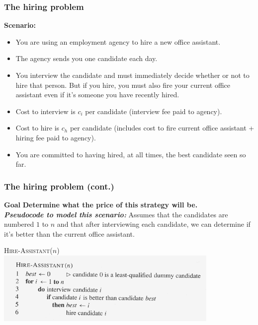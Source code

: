 \documentclass[notes,serif]{beamer}
\begin{document}
\begin{frame}
  \frametitle{The hiring problem}
  \begin{block}{\bf Scenario:}
    \begin{itemize}
      \item You are using an employment agency to hire a new office assistant.
      \item The agency sends you one candidate each day.
      \item You interview the candidate and must immediately decide whether or not to
hire that person.  But if you hire, you must also fire your current office assistant even if it's someone you have recently hired.
      \item Cost to interview is $c_i$ per candidate (interview fee paid to agency).
      \item Cost to hire is $c_h$ per candidate (includes cost to fire current office assistant + hiring fee paid to agency).
      \item You are committed to having hired, at all times, the best candidate seen so far.
    \end{itemize}
  \end{block}
\end{frame}

\begin{frame}
  \frametitle{The hiring problem (cont.)}
  \begin{alertblock}{\bf Goal}
    {\bf Determine what the price of this strategy will be.} \\
    {\bf \em Pseudocode to model this scenario:}  Assumes that the candidates are numbered $1$ to $n$ and that after interviewing each candidate, we can determine if it's better than the current office assistant.
  \end{alertblock}
  \begin{block}{\textsc{Hire-Assistant($n$)}}
    \includegraphics[height=3.5cm]{05-hire_assistant}
  \end{block}
\end{frame}
\end{document}
